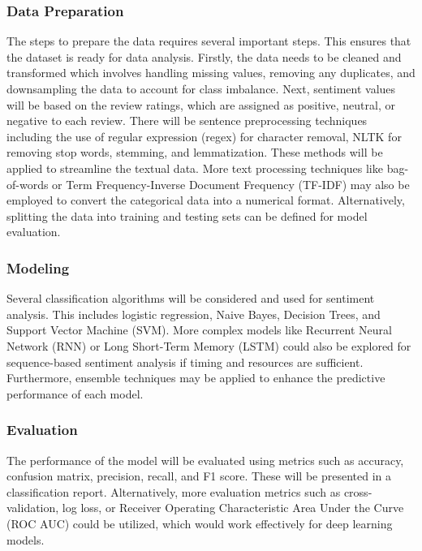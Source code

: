 \documentclass[stu,12pt,floatsintext]{apa7}
\begin{document}
\subsubsection{Data Preparation}
The steps to prepare the data requires several important steps. This ensures that the dataset is ready for data analysis. Firstly, the data needs to be cleaned and transformed which involves handling missing values, removing any duplicates, and downsampling the data to account for class imbalance. Next, sentiment values will be based on the review ratings, which are assigned as positive, neutral, or negative to each review. There will be sentence preprocessing techniques including the use of regular expression (regex) for character removal, NLTK for removing stop words, stemming, and lemmatization. These methods will be applied to streamline the textual data. More text processing techniques like bag-of-words or Term Frequency-Inverse Document Frequency (TF-IDF) may also be employed to convert the categorical data into a numerical format. Alternatively, splitting the data into training and testing sets can be defined for model evaluation. 

\subsubsection{Modeling}
Several classification algorithms will be considered and used for sentiment analysis. This includes logistic regression, Naive Bayes, Decision Trees, and Support Vector Machine (SVM). More complex models like Recurrent Neural Network (RNN) or Long Short-Term Memory (LSTM) could also be explored for sequence-based sentiment analysis if timing and resources are sufficient. Furthermore, ensemble techniques may be applied to enhance the predictive performance of each model.

\subsubsection{Evaluation}
The performance of the model will be evaluated using metrics such as accuracy, confusion matrix, precision, recall, and F1 score. These will be presented in a classification report. Alternatively, more evaluation metrics such as cross-validation, log loss, or Receiver Operating Characteristic Area Under the Curve (ROC AUC) could be utilized, which would work effectively for deep learning models. 
\end{document}
